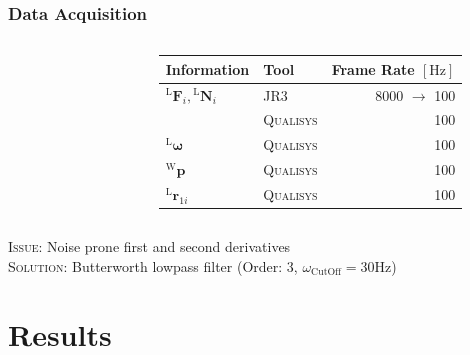\documentclass[student,noshadow]{ITRslides}
\renewcommand{\vec}[1]{\boldsymbol{#1}}
\renewcommand{\vec}[1]{\boldsymbol{#1}}
\newcommand{\scr}[1]{\mathrm{#1}}
\begin{document}
\begin{frame}
	\frametitle{Data Acquisition}
	\begin{columns}
		\begin{column}{0.35\textwidth}
			\begin{figure}
				\centering
				
			\end{figure}	
		\end{column}
		\begin{column}{0.65\textwidth}
			\begin{tabular}{llr}
				\toprule
				Information                                   & Tool              & Frame Rate $\left[\mathrm{Hz}\right]$ \\
				\midrule
				${^\scr{L}}\vec{F}_{i},{^\scr{L}}\vec{N}_{i}$ & \textsc{JR3}      & 8000 $\rightarrow$ 100                \\
				                                              & \textsc{Qualisys} & 100                                   \\
				$^\scr{L}\vec{\omega}$                        & \textsc{Qualisys} & 100                                   \\
				$^\scr{W}\vec{p}$                             & \textsc{Qualisys} & 100                                   \\
				$^\scr{L}\vec{r}_{1i}$                        & \textsc{Qualisys} & 100                                   \\
				\bottomrule
			\end{tabular}
		\end{column}
	\end{columns}
	\textsc{Issue}: Noise prone first and second derivatives\\
	\textsc{Solution}: Butterworth lowpass filter (Order: 3, $\omega_\mathrm{CutOff} = 30 \mathrm{Hz}$)
\end{frame}

\section{Results}
\end{document}
